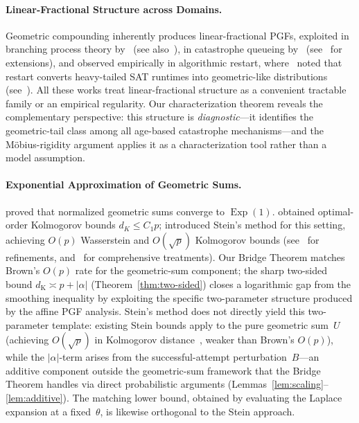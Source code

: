 \documentclass[11pt]{article}
\theoremstyle{plain}
\theoremstyle{definition}
\theoremstyle{remark}
\DeclareMathOperator{\Exp}{Exp}
\newcommand{\dK}{d_{\mathrm{K}}}
\begin{document}
\paragraph{Linear-Fractional Structure across Domains.}
Geometric compounding inherently produces linear-fractional PGFs, exploited in branching process theory by~\cite{Agresti74, Sagitov13} (see also~\cite{GrosjeanHuillet17, LindoSagitov18}), in catastrophe queueing by~\cite{BGR82, Gelenbe91} (see~\cite{KKA00, EF03, BW17} for extensions), and observed empirically in algorithmic restart, where~\cite{GSCK00} noted that restart converts heavy-tailed SAT runtimes into geometric-like distributions (see~\cite{LSZ93, vMW04, Wolter10}).  All these works treat linear-fractional structure as a convenient tractable family or an empirical regularity.  Our characterization theorem reveals the complementary perspective: this structure is \emph{diagnostic}---it identifies the geometric-tail class among all age-based catastrophe mechanisms---and the M\"obius-rigidity argument applies it as a characterization tool rather than a model assumption.

\paragraph{Exponential Approximation of Geometric Sums.}
\cite{Renyi56} proved that normalized geometric sums converge to $\Exp(1)$.  \cite{Brown90} obtained optimal-order Kolmogorov bounds $d_K \leq C_1 p$; \cite{PR11} introduced Stein's method for this setting, achieving $O(p)$ Wasserstein and $O(\sqrt{p})$ Kolmogorov bounds (see~\cite{Brown15, PRR13} for refinements, and~\cite{GK96, Kalashnikov97} for comprehensive treatments).  Our Bridge Theorem matches Brown's $O(p)$ rate for the geometric-sum component; the sharp two-sided bound $\dK \asymp p + |\alpha|$ (Theorem~\ref{thm:two-sided}) closes a logarithmic gap from the smoothing inequality by exploiting the specific two-parameter structure produced by the affine PGF analysis.  Stein's method does not directly yield this two-parameter template: existing Stein bounds apply to the pure geometric sum~$U$ (achieving $O(\sqrt{p})$ in Kolmogorov distance~\cite{PR11}, weaker than Brown's $O(p)$), while the $|\alpha|$-term arises from the successful-attempt perturbation~$B$---an additive component outside the geometric-sum framework that the Bridge Theorem handles via direct probabilistic arguments (Lemmas~\ref{lem:scaling}--\ref{lem:additive}).  The matching lower bound, obtained by evaluating the Laplace expansion at a fixed~$\theta$, is likewise orthogonal to the Stein approach.
\end{document}
